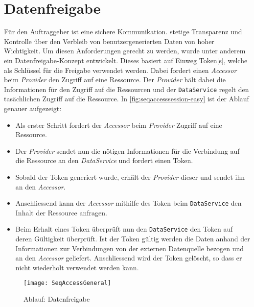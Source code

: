 \section{Datenfreigabe}
Für den Auftraggeber ist eine sichere Kommunikation. stetige Transparenz und Kontrolle über den Verbleib von benutzergenerierten Daten von hoher Wichtigkeit. Um diesen Anforderungen gerecht zu werden, wurde unter anderem ein Datenfreigabe-Konzept entwickelt. Dieses basiert auf Einweg \gls{Token}[s], welche als Schlüssel für die Freigabe verwendet werden.  Dabei fordert einen \textit{Accessor} beim \textit{Provider} den Zugriff auf eine Ressource. Der \textit{Provider} hält dabei die Informationen für den Zugriff auf die Ressourcen und der \texttt{DataService} regelt den tasächlichen Zugriff auf die Ressource. In \autoref{fig:seqaccesssession-easy} ist der Ablauf genauer aufgezeigt:
\begin{itemize}
    \item Als erster Schritt fordert der \textit{Accessor} beim \textit{Provider} Zugriff auf eine Ressource.
    \item Der \textit{Provider} sendet nun die nötigen Informationen für die Verbindung auf die Ressource an den \textit{DataService} und fordert einen Token.
    \item Sobald der Token generiert wurde, erhält der \textit{Provider} dieser und sendet ihn an den \textit{Accessor}.
    \item Anschliessend kann der \textit{Accessor} mithilfe des Token beim \texttt{DataService} den Inhalt der Ressource anfragen.
    \item Beim Erhalt eines Token überprüft nun den \texttt{DataService} den Token auf deren Gültigkeit überprüft. Ist der Token gültig werden die Daten anhand der Informationen zur Verbindungen von der externen Datenquelle bezogen und an den \textit{Accessor} geliefert. Anschliessend wird der Token gelöscht, so dass er nicht wiederholt verwendet werden kann.
\end{itemize}







    \begin{figure}[H]
    \centering
    \texttt{[image: SeqAccessGeneral]}
    \caption{Ablauf: Datenfreigabe}
    \label{fig:seqaccesssession-easy}
    \end{figure}



